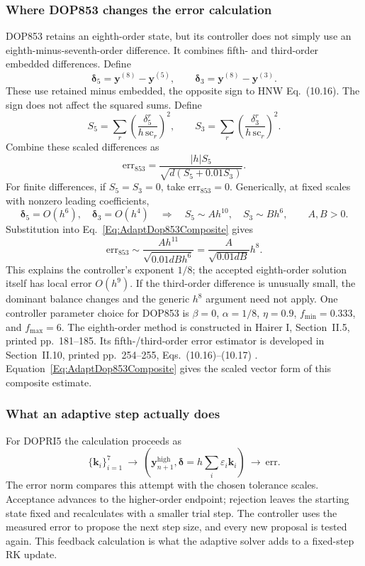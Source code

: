 \subsubsection{Where DOP853 changes the error calculation}
DOP853 retains an eighth-order state, but its controller does not simply use
an eighth-minus-seventh-order difference. It combines fifth- and third-order
embedded differences. Define
\[
 \boldsymbol\delta_5=\mathbf y^{(8)}-\mathbf y^{(5)},\qquad
 \boldsymbol\delta_3=\mathbf y^{(8)}-\mathbf y^{(3)}.
\]
These use retained minus embedded, the opposite sign to HNW Eq.~(10.16).
The sign does not affect the squared sums. Define
\[
 S_5=\sum_r\left(\frac{\delta_5^r}{h\,\mathrm{sc}_r}\right)^2,
 \qquad
 S_3=\sum_r\left(\frac{\delta_3^r}{h\,\mathrm{sc}_r}\right)^2.
\]
Combine these scaled differences as
\begin{equation}\label{Eq:AdaptDop853Composite}
 \mathrm{err}_{853}
 =\frac{|h|S_5}{\sqrt{d(S_5+0.01S_3)}}.
\end{equation}
For finite differences, if $S_5=S_3=0$, take $\mathrm{err}_{853}=0$.
Generically, at fixed scales with nonzero leading coefficients,
\[
 \boldsymbol\delta_5=O(h^6),\quad
 \boldsymbol\delta_3=O(h^4)
 \quad\Longrightarrow\quad
 S_5\sim A h^{10},\quad S_3\sim B h^6,\qquad A,B>0.
\]
Substitution into Eq.~\ref{Eq:AdaptDop853Composite} gives
\[
 \mathrm{err}_{853}
 \sim\frac{A h^{11}}{\sqrt{0.01dB h^6}}
 =\frac{A}{\sqrt{0.01dB}}h^8.
\]
This explains the controller's exponent $1/8$; the accepted eighth-order
solution itself has local error $O(h^9)$. If the third-order difference is
unusually small, the dominant balance changes and the generic $h^8$ argument
need not apply. One controller parameter choice for DOP853 is $\beta=0$, $\alpha=1/8$,
$\eta=0.9$, $f_{\min}=0.333$, and $f_{\max}=6$.
The eighth-order method is constructed in Hairer I, Section~II.5, printed
pp.~181--185. Its fifth-/third-order error estimator is developed in
Section~II.10, printed pp.~254--255, Eqs.~(10.16)--(10.17) \cite{HNW1993}.
Equation~\ref{Eq:AdaptDop853Composite} gives the scaled vector form of this
composite estimate.

\subsubsection{What an adaptive step actually does}
For DOPRI5 the calculation proceeds as
\[
 \{\mathbf k_i\}_{i=1}^7
 \ \longrightarrow\
 \left(\mathbf y_{n+1}^{\mathrm{high}},
       \boldsymbol\delta=h\sum_i\varepsilon_i\mathbf k_i\right)
 \ \longrightarrow\ \mathrm{err}.
\]
The error norm compares this attempt with the chosen tolerance scales.
Acceptance advances to the higher-order endpoint; rejection leaves the
starting state fixed and recalculates with a smaller trial step. The controller
uses the measured error to propose the next step size, and every new proposal
is tested again. This feedback calculation is what the adaptive solver adds
to a fixed-step RK update.
